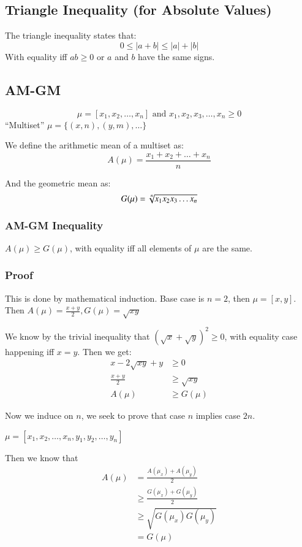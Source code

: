 \documentclass [12 pt, twoside] {book}
\newcommand\+{\text{ }}
\begin{document}
\subsection{Triangle Inequality (for Absolute Values)}
The triangle inequality states that:
$$0 \leq |a + b| \leq |a| + |b|$$
With equality iff $ab\geq0$ or $a$ and $b$ have the same signs.

\subsection{AM-GM}

$$\mu = [x_1, x_2, \dots, x_n] \text{ and } x_1, x_2, x_3, \dots, x_n \geq 0$$
``Multiset'' $\mu = \{(x, n), (y, m), \dots\}$

We define the arithmetic mean of a multiset as:
$$A(\mu) = \frac{x_1 + x_2 + \dots + x_n}{n}$$

And the geometric mean as:
$$G(\mu) = \sqrt[\uproot{2}n]{x_1x_2x_3\dots x_n}$$

\subsubsection{AM-GM Inequality}
$A(\mu) \geq G(\mu)$, with equality iff all elements
of $\mu$ are the same.

\subsubsection{Proof}
This is done by mathematical induction. Base case is $n = 2$, then $\mu = [x,
y]$. Then $A(\mu) = \frac{x + y}{2}, G(\mu) = \sqrt{xy}$

We know by the trivial inequality that $(\sqrt{x} + \sqrt{y})^2 \geq 0$, with
equality case happening iff $x = y$. Then we get:
\begin{align*}
    x - 2 \sqrt{xy} + y &\geq 0\\
        \frac{x + y}{2} &\geq \sqrt{xy}\\
                 A(\mu) &\geq G(\mu)
\end{align*}

Now we induce on $n$, we seek to prove that case $n$ implies case $2n$.

$\mu = [x_1, x_2, \dots, x_n, y_1, y_2, \dots, y_n]$

Then we know that
\begin{align*}
    A(\mu) &= \frac{A(\mu_x) + A(\mu_y)}{2}\\
           &\geq \frac{G(\mu_x) + G(\mu_y)}{2}\\
           &\geq \sqrt{G(\mu_x)G(\mu_y)}\\
           &= G(\mu)
\end{align*}
\end{document}
